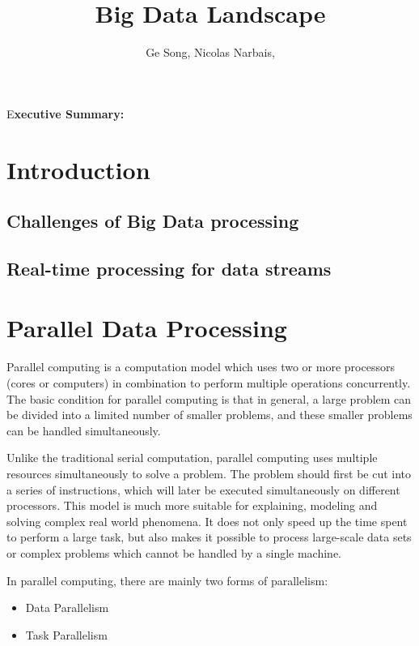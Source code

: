 \documentclass[	DIV=calc,%
							paper=a4,%
							fontsize=11pt,%
							twocolumn]{scrartcl}	 					%
\title{Big Data Landscape}					%
\author{Ge Song, Nicolas Narbais, }											%
\date{}																				%
\newcommand{\initial}[1]{%
     \lettrine[lines=3,lhang=0.3,nindent=0em]{
     				\color{DarkBlue}
     				{\textsf{#1}}}{}}
\begin{document}
\maketitle
\thispagestyle{fancy} 			%
\initial{E}\textbf{xecutive Summary: }


\section*{\color{DarkOrange}Introduction}

\subsection*{Challenges of Big Data processing}

\subsection*{Real-time processing for data streams}
 

\section*{\color{DarkOrange}Parallel Data Processing}

\initial{P}arallel computing is a computation model which uses two or more processors (cores or computers) in combination to perform multiple operations concurrently. The basic condition for parallel computing is that in general, a large problem can be divided into a limited number of smaller problems, and these smaller problems can be handled simultaneously.
					
Unlike the traditional serial computation, parallel computing uses multiple resources simultaneously to solve a problem. The problem should first be cut into a series of instructions, which will later be executed simultaneously on different processors. This model is much more suitable for explaining, modeling and solving complex real world phenomena. It does not only speed up the time spent to perform a large task, but also makes it possible to process large-scale data sets or complex problems which cannot be handled by a single machine.
					
In parallel computing, there are mainly two forms of parallelism: 
\begin{itemize}
\item Data Parallelism

\item Task Parallelism

\end{itemize}
					
\end{document}
